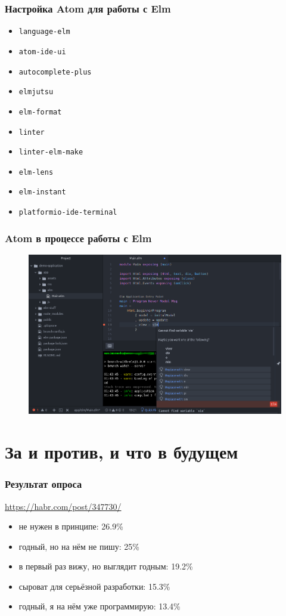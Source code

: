 \documentclass[11pt,aspectratio=169]{beamer}
\begin{document}
\begin{frame}
\frametitle{Настройка Atom для работы с Elm}
\begin{itemize}
	\item \texttt{language-elm}
	\item \texttt{atom-ide-ui}
	\item \texttt{autocomplete-plus}
	\item \texttt{elmjutsu}
	\item \texttt{elm-format}
	\item \texttt{linter}
	\item \texttt{linter-elm-make}
	\item \texttt{elm-lens}
	\item \texttt{elm-instant}
	\item \texttt{platformio-ide-terminal}
\end{itemize}
\end{frame}

\begin{frame}
\frametitle{Atom в процессе работы с Elm}
\begin{figure}
	\includegraphics[scale=0.3]{elm-code-in-atom-with-error}
\end{figure}
\end{frame}

\section{За и против, и что в будущем}

\begin{frame}
\frametitle{Результат опроса}
\url{https://habr.com/post/347730/}
\begin{itemize}
	\item не нужен в принципе: 26.9\%
	\item годный, но на нём не пишу: 25\%
	\item в первый раз вижу, но выглядит годным: 19.2\%
	\item сыроват для серьёзной разработки: 15.3\%
	\item годный, я на нём уже программирую: 13.4\%
\end{itemize}
\end{frame}
\end{document}
